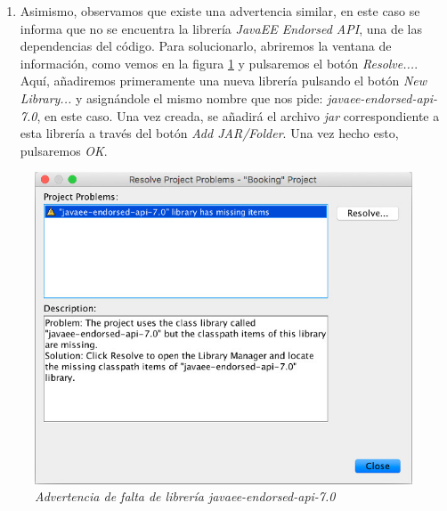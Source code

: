 \begin{enumerate}
\begin{enumerate}
\item Asimismo, observamos que existe una advertencia similar, en este caso se informa que no se encuentra la librería \textit{JavaEE Endorsed API}, una de las dependencias del código. Para solucionarlo, abriremos la ventana de información, como vemos en la figura \ref{fig:advertencia-javaee-endorsed-api} y pulsaremos el botón \textit{Resolve...}. Aquí, añadiremos primeramente una nueva librería pulsando el botón \textit{New Library...} y asignándole el mismo nombre que nos pide: \textit{javaee-endorsed-api-7.0}, en este caso. Una vez creada, se añadirá el archivo \textit{jar} correspondiente a esta librería a través del botón \textit{Add JAR/Folder}. Una vez hecho esto, pulsaremos \textit{OK}.
\end{enumerate}

\begin{figure}
\centering
  \includegraphics[scale=1]{img/instalacion/advertencia-javaee-endorsed-api.jpg}
  \caption{\textit{Advertencia de falta de librería javaee-endorsed-api-7.0}}
  \label{fig:advertencia-javaee-endorsed-api}
\end{figure}


\end{enumerate}
